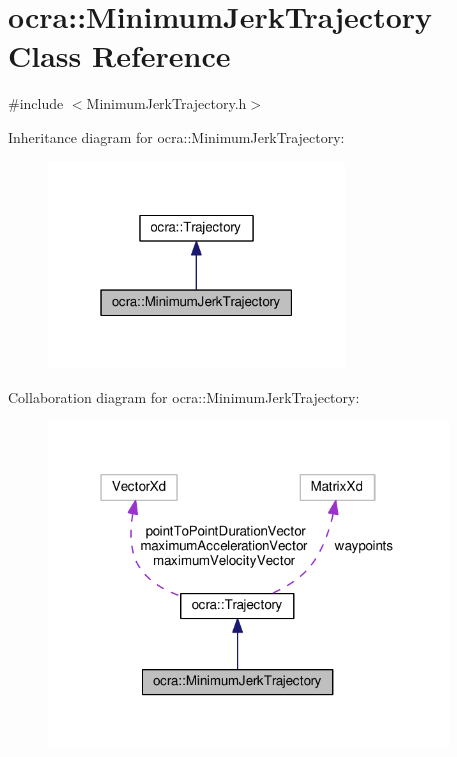 \hypertarget{classocra_1_1MinimumJerkTrajectory}{}\section{ocra\+:\+:Minimum\+Jerk\+Trajectory Class Reference}
\label{classocra_1_1MinimumJerkTrajectory}


{\ttfamily \#include $<$Minimum\+Jerk\+Trajectory.\+h$>$}



Inheritance diagram for ocra\+:\+:Minimum\+Jerk\+Trajectory\+:
\nopagebreak
\begin{figure}[H]
\begin{center}
\leavevmode
\includegraphics[width=223pt]{dc/d27/classocra_1_1MinimumJerkTrajectory__inherit__graph}
\end{center}
\end{figure}


Collaboration diagram for ocra\+:\+:Minimum\+Jerk\+Trajectory\+:
\nopagebreak
\begin{figure}[H]
\begin{center}
\leavevmode
\includegraphics[width=301pt]{d8/dcd/classocra_1_1MinimumJerkTrajectory__coll__graph}
\end{center}
\end{figure}
